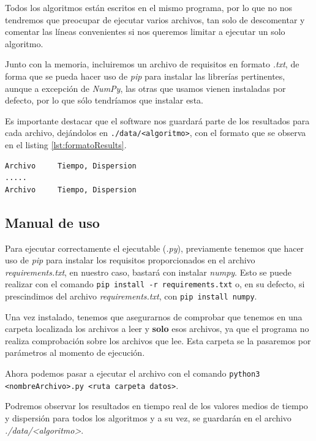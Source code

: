 Todos los algoritmos están escritos en el mismo programa, por lo que no nos tendremos que preocupar de ejecutar varios archivos, tan solo de descomentar y comentar las líneas convenientes si nos queremos limitar a ejecutar un solo algoritmo.

Junto con la memoria, incluiremos un archivo de requisitos en formato \textit{.txt}, de forma que se pueda hacer uso de \textit{pip} para instalar las librerías pertinentes, aunque a excepción de \textit{NumPy}, las otras que usamos vienen instaladas por defecto, por lo que sólo tendríamos que instalar esta.

Es importante destacar que el software nos guardará parte de los resultados para cada archivo, dejándolos en \texttt{./data/<algoritmo>}, con el formato que se observa en el listing \ref{lst:formatoResults}.

\begin{lstlisting}[frame=single, caption={Formato de los archivos para guardar la evolución de los algoritmos}, captionpos=b, label=lst:formatoResults]
Archivo     Tiempo, Dispersion
.....
Archivo     Tiempo, Dispersion
\end{lstlisting}

\subsection{Manual de uso}

Para ejecutar correctamente el ejecutable (\textit{.py}), previamente tenemos que hacer uso de \textit{pip} para instalar los requisitos proporcionados en el archivo \textit{requirements.txt}, en nuestro caso, bastará con instalar \textit{numpy}.
Esto se puede realizar con el comando \texttt{pip install -r requirements.txt} o, en su defecto, si prescindimos del archivo \textit{requirements.txt}, con \texttt{pip install numpy}.

Una vez instalado, tenemos que asegurarnos de comprobar que tenemos en una carpeta localizada los archivos a leer y \textbf{solo} esos archivos, ya que el programa no realiza comprobación sobre los archivos que lee. Esta carpeta se la pasaremos por parámetros al momento de ejecución.

Ahora podemos pasar a ejecutar el archivo con el comando \texttt{python3 <nombreArchivo>.py <ruta carpeta datos>}.

Podremos observar los resultados en tiempo real de los valores medios de tiempo y dispersión para todos los algoritmos y a su vez, se guardarán en el archivo \textit{./data/<algoritmo>}.

